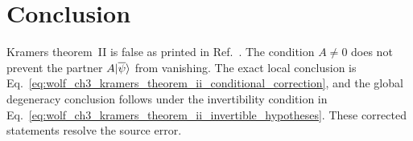 \documentclass{article}
\begin{document}
\section{Conclusion}

Kramers theorem~II is false as printed in Ref.~\cite{Wolf2012Quantum}. The
condition $A\neq 0$ does not prevent the partner
$A|\overline{\psi}\rangle$ from vanishing. The exact local conclusion is
Eq.~\ref{eq:wolf_ch3_kramers_theorem_ii_conditional_correction}, and the global
degeneracy conclusion follows under the invertibility condition in
Eq.~\ref{eq:wolf_ch3_kramers_theorem_ii_invertible_hypotheses}. These corrected
statements resolve the source error.



\end{document}
